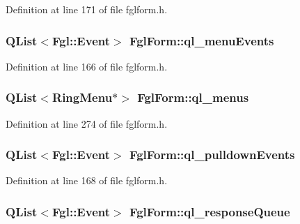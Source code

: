 Definition at line 171 of file fglform.h.

\hypertarget{classFglForm_a0a20950e5d9deba35525fbcb7935f6f0}{
\subsubsection[{ql\_\-menuEvents}]{\setlength{\rightskip}{0pt plus 5cm}QList$<${\bf Fgl::Event}$>$ {\bf FglForm::ql\_\-menuEvents}}}
\label{classFglForm_a0a20950e5d9deba35525fbcb7935f6f0}


Definition at line 166 of file fglform.h.

\hypertarget{classFglForm_a587196a08706e03ec05f1fae4048f344}{
\subsubsection[{ql\_\-menus}]{\setlength{\rightskip}{0pt plus 5cm}QList$<${\bf RingMenu}$\ast$$>$ {\bf FglForm::ql\_\-menus}}}
\label{classFglForm_a587196a08706e03ec05f1fae4048f344}


Definition at line 274 of file fglform.h.

\hypertarget{classFglForm_a14b1e58865612b4ebbfa83c8769f9353}{
\subsubsection[{ql\_\-pulldownEvents}]{\setlength{\rightskip}{0pt plus 5cm}QList$<${\bf Fgl::Event}$>$ {\bf FglForm::ql\_\-pulldownEvents}}}
\label{classFglForm_a14b1e58865612b4ebbfa83c8769f9353}


Definition at line 168 of file fglform.h.

\hypertarget{classFglForm_a3aa184c0556d81cfb244f726d95b0538}{
\subsubsection[{ql\_\-responseQueue}]{\setlength{\rightskip}{0pt plus 5cm}QList$<${\bf Fgl::Event}$>$ {\bf FglForm::ql\_\-responseQueue}}}
\label{classFglForm_a3aa184c0556d81cfb244f726d95b0538}


